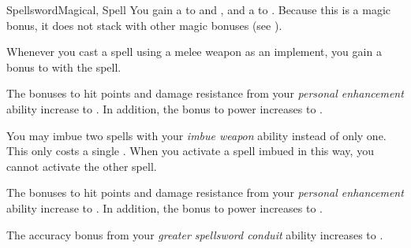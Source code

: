 \begin{feat}{Spellsword}{Magical, Spell}
         You gain a   to  and , and a   to .
        Because this is a magic bonus, it does not stack with other magic bonuses (see ).

         Whenever you cast a spell using a melee weapon as an implement, you gain a  bonus to  with the spell.

         The bonuses to hit points and damage resistance from your \textit{personal enhancement} ability increase to .
        In addition, the bonus to power increases to .

         You may imbue two spells with your \textit{imbue weapon} ability instead of only one.
        This only costs a single .
        When you activate a spell imbued in this way, you  cannot activate the other spell.

         The bonuses to hit points and damage resistance from your \textit{personal enhancement} ability increase to .
        In addition, the bonus to power increases to .

         The accuracy bonus from your \textit{greater spellsword conduit} ability increases to .
    \end{feat}

